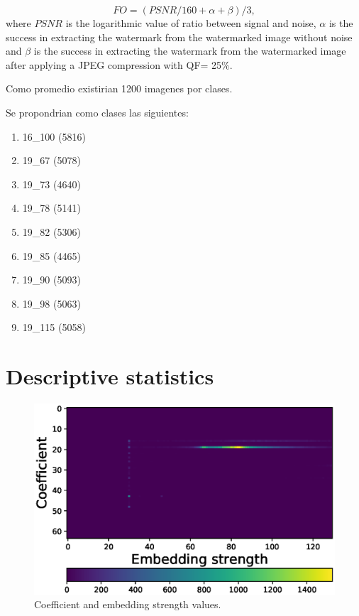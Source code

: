 \documentclass[runningheads]{llncs}
\begin{document}
\begin{equation}
FO = (PSNR/160 + \alpha + \beta)/3,
\label{FA}
\end{equation}
where $PSNR$ is the logarithmic value of ratio between signal and noise, $ \alpha $ is the success in extracting the watermark from the watermarked image without noise and $ \beta $ is the success in extracting the watermark from the watermarked image after applying a JPEG compression with QF= 25{\%}.

Como promedio existirian 1200 imagenes por clases.

Se propondrian como clases las siguientes:
\begin{enumerate}
	\item 16\_100 (5816)
	\item 19\_67 (5078)
	\item 19\_73 (4640)
	\item 19\_78 (5141)
	\item 19\_82 (5306)
	\item 19\_85 (4465)
	\item 19\_90 (5093)
	\item 19\_98 (5063)
	\item 19\_115 (5058)
\end{enumerate}

\section{Descriptive statistics}

\begin{figure} [H]
	\begin{center}
		\includegraphics[width=\textwidth]{colormap.eps}
		\caption{Coefficient and embedding strength values.} \label{colormap}
	\end{center}
\end{figure}
\end{document}
